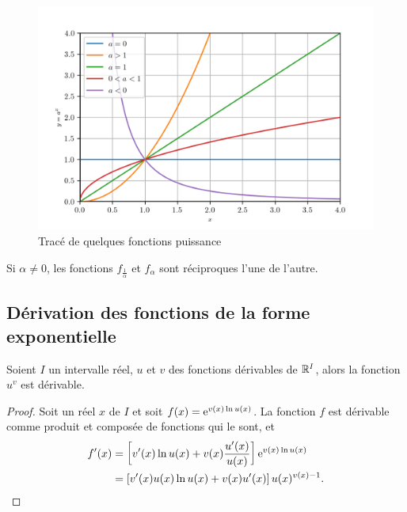 \begin{figure}
    \centering
    \includegraphics[scale=0.8]{puiss.png}
    \caption{Tracé de quelques fonctions puissance}
    \label{figtracepuissance}
\end{figure}
Si \(\alpha \neq 0\), les fonctions \(f_{\frac{1}{\alpha}}\) et 
\(f_\alpha\) sont réciproques l'une de l'autre.
\subsection{Dérivation des fonctions de la forme exponentielle}
\label{subsec:chap1-derivationdesfonctionsdelaformeexponentielle}
\begin{prop}
    Soient \(I\) un intervalle réel, \(u\) et \(v\) des fonctions 
    dérivables de \(\mathbb{R}^{I}\), alors la fonction \(u^v\) est 
    dérivable.
\end{prop}
\begin{proof}
    Soit un réel \(x\) de \(I\) et soit \(f(x)=\operatorname{e}^{v(x) \ln u(x)}\). 
    La fonction \(f\) est dérivable comme produit et composée de 
    fonctions qui le sont, et
    \begin{align}
        f'(x) &=\left[ v'(x) \ln u(x) + v(x) \frac{u'(x)}{u(x)} 
        \right]\operatorname{e}^{v(x) \ln u(x)} \\
              &= \left[v'(x)u(x)\ln u(x) + v(x) u'(x) 
              \right]u(x)^{v(x)-1}.
    \end{align}
\end{proof}
